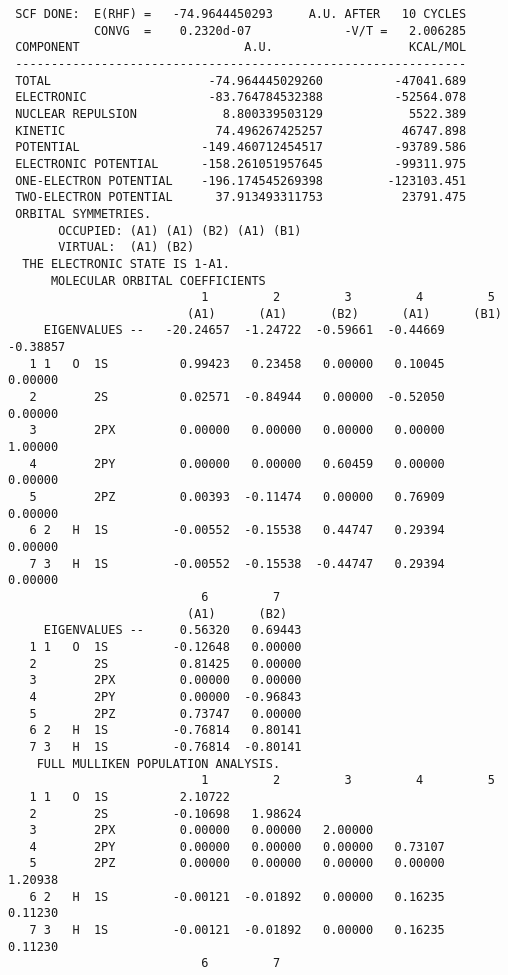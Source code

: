 {\begin{verbatim}
 SCF DONE:  E(RHF) =   -74.9644450293     A.U. AFTER   10 CYCLES
            CONVG  =    0.2320d-07             -V/T =   2.006285
 COMPONENT                       A.U.                   KCAL/MOL
 ---------------------------------------------------------------
 TOTAL                      -74.964445029260          -47041.689
 ELECTRONIC                 -83.764784532388          -52564.078
 NUCLEAR REPULSION            8.800339503129            5522.389
 KINETIC                     74.496267425257           46747.898
 POTENTIAL                 -149.460712454517          -93789.586
 ELECTRONIC POTENTIAL      -158.261051957645          -99311.975
 ONE-ELECTRON POTENTIAL    -196.174545269398         -123103.451
 TWO-ELECTRON POTENTIAL      37.913493311753           23791.475
 ORBITAL SYMMETRIES.
       OCCUPIED: (A1) (A1) (B2) (A1) (B1)
       VIRTUAL:  (A1) (B2)
  THE ELECTRONIC STATE IS 1-A1.
      MOLECULAR ORBITAL COEFFICIENTS
                           1         2         3         4         5
                         (A1)      (A1)      (B2)      (A1)      (B1)
     EIGENVALUES --   -20.24657  -1.24722  -0.59661  -0.44669  -0.38857
   1 1   O  1S          0.99423   0.23458   0.00000   0.10045   0.00000
   2        2S          0.02571  -0.84944   0.00000  -0.52050   0.00000
   3        2PX         0.00000   0.00000   0.00000   0.00000   1.00000
   4        2PY         0.00000   0.00000   0.60459   0.00000   0.00000
   5        2PZ         0.00393  -0.11474   0.00000   0.76909   0.00000
   6 2   H  1S         -0.00552  -0.15538   0.44747   0.29394   0.00000
   7 3   H  1S         -0.00552  -0.15538  -0.44747   0.29394   0.00000
                           6         7
                         (A1)      (B2)
     EIGENVALUES --     0.56320   0.69443
   1 1   O  1S         -0.12648   0.00000
   2        2S          0.81425   0.00000
   3        2PX         0.00000   0.00000
   4        2PY         0.00000  -0.96843
   5        2PZ         0.73747   0.00000
   6 2   H  1S         -0.76814   0.80141
   7 3   H  1S         -0.76814  -0.80141
    FULL MULLIKEN POPULATION ANALYSIS.
                           1         2         3         4         5
   1 1   O  1S          2.10722
   2        2S         -0.10698   1.98624
   3        2PX         0.00000   0.00000   2.00000
   4        2PY         0.00000   0.00000   0.00000   0.73107
   5        2PZ         0.00000   0.00000   0.00000   0.00000   1.20938
   6 2   H  1S         -0.00121  -0.01892   0.00000   0.16235   0.11230
   7 3   H  1S         -0.00121  -0.01892   0.00000   0.16235   0.11230
                           6         7

\end{verbatim}}

